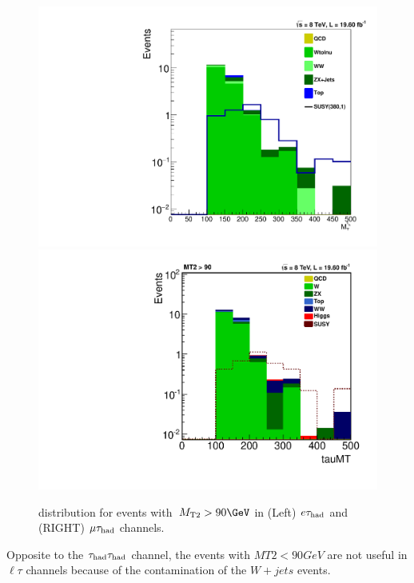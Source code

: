 \begin{figure}[htbp]
\centering
\includegraphics[angle=0,scale=0.35]{SelectionEleTau/TauMT.pdf}
\includegraphics[angle=0,scale=0.35]{SelectionMuTau/tauMT_MuTau.pdf}
\caption{\tauMT distribution for events with $\mttwo>90\GeV$ in (Left) $e\tau_{\rm had}$ and (RIGHT) $\mu\tau_{\rm had}$ channels.}
\label{fig:taumtleptontau}
\end{figure}

Opposite to the $\tau_{\rm had}\tau_{\rm had}$ channel, the events with $MT2<90 GeV$ are not useful in $\ell\tau$ channels because of the contamination of the $W+jets$ events.
